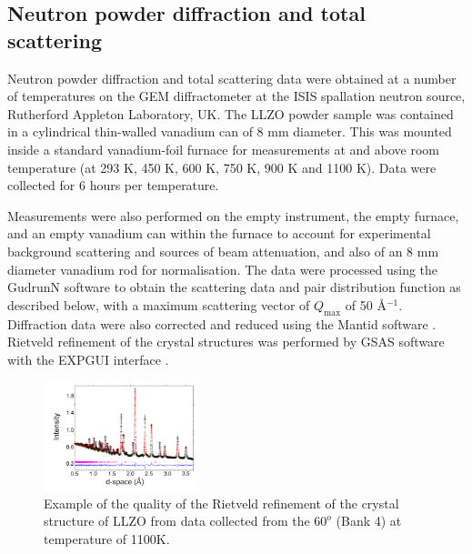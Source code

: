 \documentclass[twoside,twocolumn,9pt]{article}
\begin{document}
\subsection{Neutron powder diffraction and total scattering}

Neutron powder diffraction and total scattering data were obtained at a number of temperatures on the GEM diffractometer \cite{Hannon:2005cy} at the
ISIS spallation neutron source, Rutherford Appleton Laboratory, UK. The LLZO powder sample was contained in a cylindrical thin-walled vanadium can of 8 mm diameter.
This was mounted inside a standard vanadium-foil furnace for measurements at and above room temperature (at 293 K, 450 K, 600 K, 750 K,
900 K and 1100 K). Data were collected for 6 hours per temperature.

Measurements were also performed on the empty instrument, the empty furnace, and an empty vanadium can within the furnace to account for experimental background scattering and sources of beam attenuation, and also of an 8 mm diameter vanadium rod for normalisation. The data were processed using the GudrunN software \cite{Soper:2012vs} to obtain the scattering data and pair distribution function as described below, with a maximum scattering vector of $Q_\mathrm{max}$ of 50 \AA$^{-1}$. Diffraction data were also corrected and reduced using the Mantid software \cite{Arnold:2014iy}. Rietveld refinement of the crystal structures was performed by GSAS software \cite{Larson:2004wv} with the EXPGUI interface \cite{gsasgui}.

\begin{figure}[t]
\begin{center}
\includegraphics[width=0.4\textwidth]{Pics/1100KBank4v03.pdf}
\caption{Example of the quality of the Rietveld refinement of the crystal structure
 of LLZO from data collected from the $60^o$ (Bank 4) at temperature of 1100K.}
\label{fig:gsas}
\end{center}
\end{figure}
\end{document}
